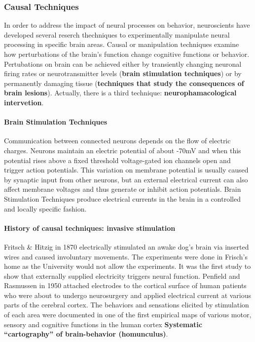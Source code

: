 \documentclass[12pt,article,oneside,a4paper]{memoir}
\begin{document}
\subsubsection{Causal Techniques}
In order to address the impact of neural processes on behavior, neuroscients have
developed several reserch thechniques to experimentally manipulate neural processing
in specific brain areas. Causal or manipulation techniques examine how perturbations
of the brain’s function change cognitive functions or behavior. Pertubations on brain
can be achieved either by transiently changing neuronal firing rates or neurotransmitter
levels (\textbf{brain stimulation techniques}) or by permanently damaging tissue
(\textbf{techniques that study the consequences of brain lesions}).
Actually, there is a third technique: \textbf{neurophamacological intervetion}.

\paragraph{Brain Stimulation Techniques}
Communication between connected neurons depends on the flow of electric charges.
Neurons maintain an electric potential of about -70mV and when this potential
rises above a fixed threshold voltage-gated ion channels open and trigger action
potentials. This variation on membrane potential is usually caused by synaptic
input from other neurons, but an external electrical current can also affect
membrane voltages and thus generate or inhibit action potentials.
Brain Stimulation Techniques produce electrical currents in the brain in a 
controlled and locally specific fashion.

\paragraph{History of causal techniques: invasive stimulation}
Fritsch \& Hitzig in 1870 electrically stimulated an awake dog's brain via 
inserted wires and caused involuntary movements. The experiments were done in 
Frisch's home as the University would not allow the experiments. It was the 
first study to show that externally supplied electricity triggers neural function.
Penfield and Rasmussen in 1950 attached electrodes to the cortical surface of human
patients who were about to undergo neurosurgery and applied electrical current at
various parts of the cerebral cortex. The behaviors and sensations elicited by
stimulation of each area were documented in one of the first empirical maps of various
motor, sensory and cognitive functions in the human cortex \textbf{Systematic
``cartography'' of brain-behavior (homunculus)}.
\end{document}
